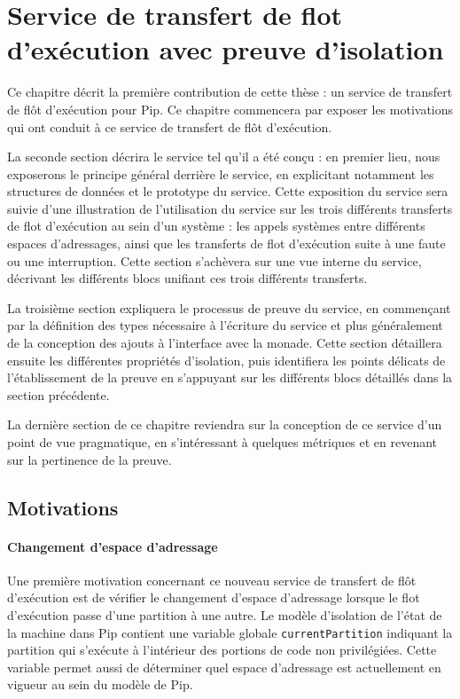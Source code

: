 \chapter{Service de transfert de flot d'exécution avec preuve d'isolation}

Ce chapitre décrit la première contribution de cette thèse : un service de transfert de flôt d'exécution pour Pip. Ce chapitre commencera par exposer les motivations qui ont conduit à ce service de transfert de flôt d'exécution.

La seconde section décrira le service tel qu'il a été conçu : en premier lieu, nous exposerons le principe général derrière le service, en explicitant notamment les structures de données et le prototype du service. Cette exposition du service sera suivie d'une illustration de l'utilisation du service sur les trois différents transferts de flot d'exécution au sein d'un système : les appels systèmes entre différents espaces d'adressages, ainsi que les transferts de flot d'exécution suite à une faute ou une interruption. Cette section s'achèvera sur une vue interne du service, décrivant les différents blocs unifiant ces trois différents transferts.

La troisième section expliquera le processus de preuve du service, en commençant par la définition des types nécessaire à l'écriture du service et plus généralement de la conception des ajouts à l'interface avec la monade. Cette section détaillera ensuite les différentes propriétés d'isolation, puis identifiera les points délicats de l'établissement de la preuve en s'appuyant sur les différents blocs détaillés dans la section précédente.

La dernière section de ce chapitre reviendra sur la conception de ce service d'un point de vue pragmatique, en s'intéressant à quelques métriques et en revenant sur la pertinence de la preuve.

	\section{Motivations}

		\subsubsection{Changement d'espace d'adressage}

		Une première motivation concernant ce nouveau service de transfert de flôt d'exécution est de vérifier le changement d'espace d'adressage lorsque le flot d'exécution passe d'une partition à une autre. Le modèle d'isolation de l'état de la machine dans Pip contient une variable globale \texttt{currentPartition} indiquant la partition qui s'exécute à l'intérieur des portions de code non privilégiées. Cette variable permet aussi de déterminer quel espace d'adressage est actuellement en vigueur au sein du modèle de Pip.

